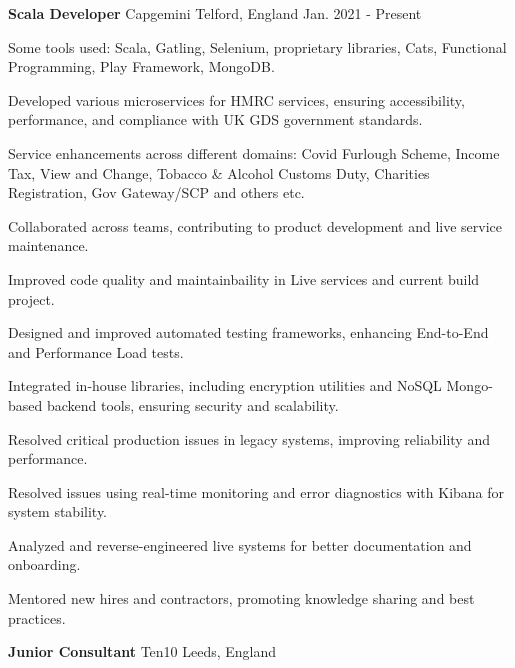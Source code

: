 
\begin{cventries}

  \cventry
    {\textbf{Scala Developer}} %
    {Capgemini} 
    {Telford, England} 
    {Jan. 2021 - Present} 
    {
      \begin{sloppypar}  %
      \begin{cvitems}
        \item {Some tools used: Scala, Gatling, Selenium, proprietary libraries, Cats, Functional Programming, Play Framework, MongoDB.}
        \item {Developed various microservices for HMRC services, ensuring accessibility, performance, and compliance with UK GDS government standards.}
        \item {Service enhancements across different domains: Covid Furlough Scheme, Income Tax, View and Change, Tobacco \& Alcohol Customs Duty, Charities Registration, Gov Gateway/SCP and others etc.}
        \item {Collaborated across teams, contributing to product development and live service maintenance.}
        \item {Improved code quality and maintainbaility in Live services and current build project.}
        \item {Designed and improved automated testing frameworks, enhancing End-to-End and Performance Load tests.}
        \item {Integrated in-house libraries, including encryption utilities and NoSQL Mongo-based backend tools, ensuring security and scalability.}
        \item {Resolved critical production issues in legacy systems, improving reliability and performance.}
        \item {Resolved issues using real-time monitoring and error diagnostics with Kibana for system stability.}
        \item {Analyzed and reverse-engineered live systems for better documentation and onboarding.}
        \item {Mentored new hires and contractors, promoting knowledge sharing and best practices.}
      \end{cvitems}
      \end{sloppypar}
    }
    \cventry
    {\textbf{Junior Consultant}} 
    {Ten10} 
    {Leeds, England} 

\end{cventries}
